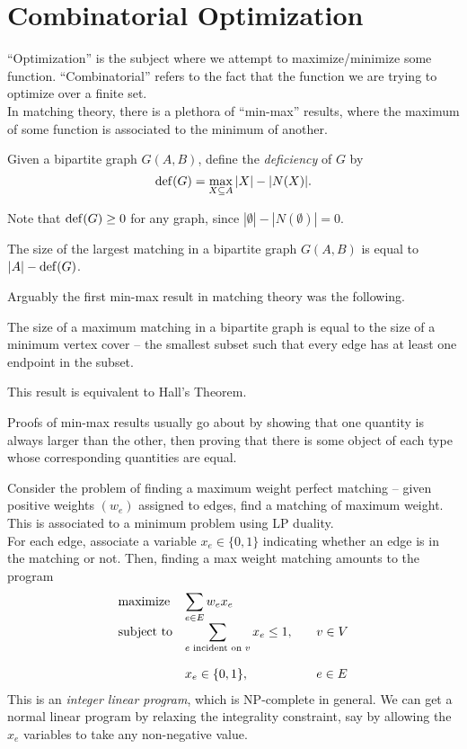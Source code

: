 
\section{Combinatorial Optimization}

	``Optimization'' is the subject where we attempt to maximize/minimize some function. ``Combinatorial'' refers to the fact that the function we are trying to optimize over a finite set.\\
	In matching theory, there is a plethora of ``min-max'' results, where the maximum of some function is associated to the minimum of another.

	\begin{fdef}
		Given a bipartite graph $G(A,B)$, define the \emph{deficiency} of $G$ by
		\[ \operatorname{def}(G) = \max_{X \subseteq A} |X| - |N(X)|. \]
	\end{fdef}
	Note that $\operatorname{def}(G) \ge 0$ for any graph, since $|\emptyset| - |N(\emptyset)| = 0$.

	\begin{fprop}
		The size of the largest matching in a bipartite graph $G(A,B)$ is equal to $|A| - \operatorname{def}(G)$.
	\end{fprop}

	Arguably the first min-max result in matching theory was the following.

	\begin{ftheo}
		\label{theo: konigs theorem}
		The size of a maximum matching in a bipartite graph is equal to the size of a minimum vertex cover -- the smallest subset such that every edge has at least one endpoint in the subset.
	\end{ftheo}
	This result is equivalent to Hall's Theorem.

	Proofs of min-max results usually go about by showing that one quantity is always larger than the other, then proving that there is some object of each type whose corresponding quantities are equal.

	Consider the problem of finding a maximum weight perfect matching -- given positive weights $(w_e)$ assigned to edges, find a matching of maximum weight. This is associated to a minimum problem using LP duality.\\
	For each edge, associate a variable $x_e \in \{0,1\}$ indicating whether an edge is in the matching or not. Then, finding a max weight matching amounts to the program
	\[
	\begin{array}{ll@{}ll}
	\text{maximize}  & \displaystyle\sum_{e \in E} w_{e} x_{e} &\\
	\text{subject to}& \displaystyle\sum\limits_{e \text{ incident on } v} x_{e} \le 1,  &\qquad v \in V\\\\
	                 & x_{e} \in \{0,1\},                                                &\qquad e \in E
	\end{array}
	\]
	This is an \emph{integer linear program}, which is \textsf{NP}-complete in general. We can get a normal linear program by relaxing the integrality constraint, say by allowing the $x_e$ variables to take any non-negative value.

